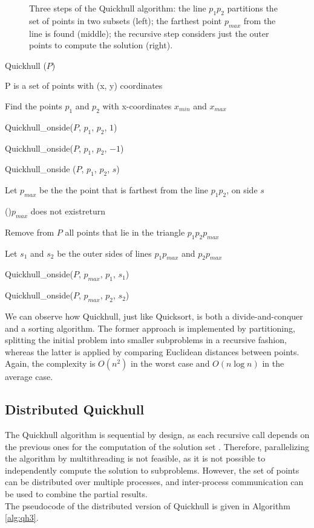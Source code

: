 \documentclass[]{finalproject}
\begin{document}
\begin{figure}[H]
\begin{minipage}{.33\linewidth}
	\end{minipage}
    \caption{Three steps of the Quickhull algorithm: the line $p_1p_2$ partitions the set of points in two subsets (left); the farthest point $p_{max}$ from the line is found (middle); the recursive step considers just the outer points to compute the solution (right).}
    \label{fig:qh-steps}
\end{figure}

\begin{algorithm}
    \caption{Quickhull ($P$)}
    \label{alg:qh1}
    P is a set of points with (x, y) coordinates

    Find the points $p_1$ and $p_2$ with x-coordinates $x_{min}$ and $x_{max}$

    Quickhull\_onside($P$, $p_1$, $p_2$, $1$)

    Quickhull\_onside($P$, $p_1$, $p_2$, $-1$)
\end{algorithm}
\begin{algorithm}
  \caption{Quickhull\_onside ($P$, $p_1$, $p_2$, $s$)}
  \label{alg:qh2}
  Let $p_{max}$ be the the point that is farthest from the line $p_1p_2$, on side $s$

  \If(){$p_{max}$ does not exist}{return}

  Remove from $P$ all points that lie in the triangle $p_1p_2p_{max}$

  Let $s_1$ and $s_2$ be the outer sides of lines $p_1p_{max}$ and $p_2p_{max}$

  Quickhull\_onside($P$, $p_{max}$, $p_1$, $s_1$)

  Quickhull\_onside($P$, $p_{max}$, $p_2$, $s_2$)
\end{algorithm}

We can observe how Quickhull, just like Quicksort,
is both a divide-and-conquer and a sorting algorithm. The former approach is implemented by partitioning,
splitting the initial problem into smaller subproblems in a recursive fashion, whereas the latter is applied by comparing
Euclidean distances between points. Again, the complexity is $O(n^2)$ in the worst case and $O(n\log{n})$ in the average case.

\subsection{Distributed Quickhull}
The Quickhull algorithm is sequential by design,
as each recursive call depends on the previous ones for the computation of the solution set \cite{rameshconvex}.
Therefore, parallelizing the algorithm by multithreading is not feasible, as it is not possible to independently compute the solution to subproblems.
However, the set of points can be distributed over multiple processes, and inter-process communication can be used to combine the partial results.\\
The pseudocode of the distributed version of Quickhull is given in Algorithm \ref{alg:qh3}.
\end{document}
